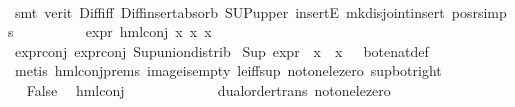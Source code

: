 \begin{isabellebody}
\ \ \ \ \ \ \ \ \ \ \isamarkupfalse%
\ {\isacharparenleft}{\kern0pt}smt\ {\isacharparenleft}{\kern0pt}verit{\isacharparenright}{\kern0pt}\ Diff{\isacharunderscore}{\kern0pt}iff\ Diff{\isacharunderscore}{\kern0pt}insert{\isacharunderscore}{\kern0pt}absorb\ SUP{\isacharunderscore}{\kern0pt}upper\ insertE\ mk{\isacharunderscore}{\kern0pt}disjoint{\isacharunderscore}{\kern0pt}insert\ pos{\isacharunderscore}{\kern0pt}r{\isachardot}{\kern0pt}simps{\isacharparenright}{\kern0pt}\isanewline
\ \ \ \ \ \ \ \ \isamarkupfalse%
\ {\isachardoublequoteopen}expr{\isacharunderscore}{\kern0pt}{}\ {\isacharparenleft}{\kern0pt}hml{\isacharunderscore}{\kern0pt}conj\ x{}{}\ x{}{}\ x{}{}{\isacharparenright}{\kern0pt}\ {\isasymge}\ {}{\isachardoublequoteclose}\isanewline
\ \ \ \ \ \ \ \ \ \ \isamarkupfalse%
\ expr{\isacharunderscore}{\kern0pt}{}{\isacharunderscore}{\kern0pt}conj\ expr{\isacharunderscore}{\kern0pt}{}{\isacharunderscore}{\kern0pt}conj\ Sup{\isacharunderscore}{\kern0pt}union{\isacharunderscore}{\kern0pt}distrib\ \isanewline
{\isacartoucheopen}Sup\ {\isacharparenleft}{\kern0pt}{\isacharparenleft}{\kern0pt}expr{\isacharunderscore}{\kern0pt}{}\ {\isasymcirc}\ x{}{}{\isacharparenright}{\kern0pt}\ {\isacharbackquote}{\kern0pt}\ x{}{}{\isacharparenright}{\kern0pt}\ {\isasymle}\ {}{\isacartoucheclose}\ bot{\isacharunderscore}{\kern0pt}enat{\isacharunderscore}{\kern0pt}def\isanewline
\ \ \ \ \ \ \ \ \ \ \isamarkupfalse%
\ {\isacharparenleft}{\kern0pt}metis\ hml{\isacharunderscore}{\kern0pt}conj{\isachardot}{\kern0pt}prems{\isacharparenleft}{\kern0pt}{}{\isacharparenright}{\kern0pt}\ image{\isacharunderscore}{\kern0pt}is{\isacharunderscore}{\kern0pt}empty\ le{\isacharunderscore}{\kern0pt}iff{\isacharunderscore}{\kern0pt}sup\ not{\isacharunderscore}{\kern0pt}one{\isacharunderscore}{\kern0pt}le{\isacharunderscore}{\kern0pt}zero\ sup{\isacharunderscore}{\kern0pt}bot{\isacharunderscore}{\kern0pt}right{\isacharparenright}{\kern0pt}\isanewline
\ \ \ \ \ \ \ \ \isamarkupfalse%
\ \isamarkupfalse%
\ False\ \isamarkupfalse%
\ hml{\isacharunderscore}{\kern0pt}conj{\isacharparenleft}{\kern0pt}{}{\isacharparenright}{\kern0pt}\ \isanewline
\ \ \ \ \ \ \ \ \ \ \isamarkupfalse%
\ dual{\isacharunderscore}{\kern0pt}order{\isachardot}{\kern0pt}trans\ not{\isacharunderscore}{\kern0pt}one{\isacharunderscore}{\kern0pt}le{\isacharunderscore}{\kern0pt}zero\ \isamarkupfalse%

\end{isabellebody}
